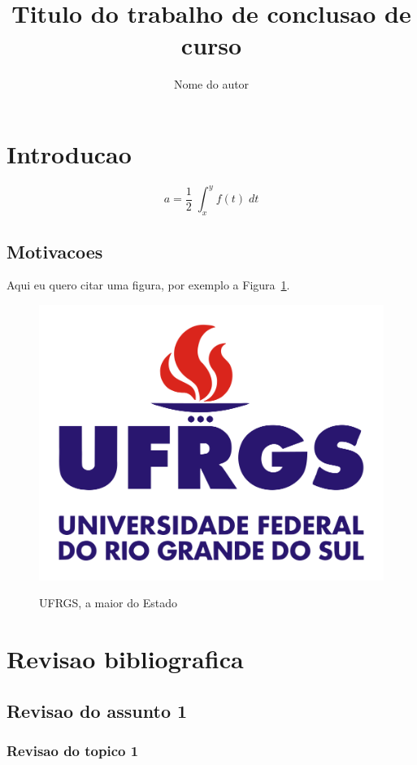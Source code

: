 \documentclass{automatex}
\title{Titulo do trabalho de conclusao de curso}
\author{Nome do autor}
\begin{document}
\maketitle

\section{Introducao}

\lipsum[1-2]
\begin{equation}
  a = \dfrac{1}{2}\;\int_x^y f(t)\; dt
\end{equation}

\lipsum[24-26]

\subsection{Motivacoes}

Aqui eu quero citar uma figura, por exemplo a Figura~\ref{fig:ufrgs}.

\begin{figure}[h]
  \centering
  \includegraphics[width=.5\textwidth]{imagens/logo_ufrgs}
  \label{fig:ufrgs}
  \caption{UFRGS, a maior do Estado}
\end{figure}

\newpage

\section{Revisao bibliografica}

\lipsum[10]

\subsection{Revisao do assunto 1}

\lipsum[11]

\subsubsection{Revisao do topico 1}

\lipsum[12]
\end{document}

